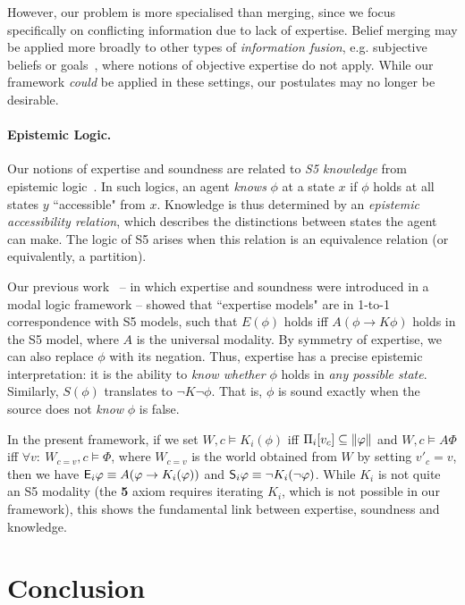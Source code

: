 However, our problem is more specialised than merging, since we focus
specifically on conflicting information due to lack of expertise. Belief
merging may be applied more broadly to other types of \emph{information
fusion}, e.g. subjective beliefs or goals~\cite{gregoire_fusion_2006},
where notions of objective expertise do not apply. While our framework
\emph{could} be applied in these settings, our postulates may no longer be
desirable.

\paragraph{Epistemic Logic.}

Our notions of expertise and soundness are related to \emph{S5
knowledge} from epistemic logic~\cite{handbook_epistemic}. In such
logics, an agent \emph{knows} $\phi$ at a state $x$ if $\phi$ holds at all
states $y$ ``accessible" from $x$. Knowledge is thus determined by an
\emph{epistemic accessibility relation}, which describes the distinctions
between states the agent can make. The logic of S5 arises when this relation is an
equivalence relation (or equivalently, a partition).

Our previous work~\cite{singleton2021logic} -- in which expertise and soundness
were introduced in a modal logic framework -- showed that ``expertise
models" are in 1-to-1 correspondence with S5 models, such that $E(\phi)$
holds iff $A(\phi \rightarrow K\phi)$ holds in the S5 model, where $A$ is the
universal modality. By symmetry of expertise, we can also replace $\phi$ with
its negation. Thus, expertise has a precise epistemic interpretation: it is the
ability to \emph{know whether} $\phi$ holds in \emph{any possible state}.
Similarly, $S(\phi)$ translates to $\neg K \neg \phi$. That is, $\phi$ is sound
exactly when the source does not \emph{know} $\phi$ is false.

In the present framework, if we set
%
$W, c \models K_i(\phi)$ iff $\Pi_i[v_c] \subseteq \propmods{\phi}$ and
%
$W, c \models A\Phi$ iff $\forall v:\ W_{c=v}, c \models \Phi$,
%
where $W_{c=v}$ is the world obtained from $W$ by setting $v'_c = v$, then we
have $\E_i\phi \equiv A(\phi \rightarrow K_i(\phi))$ and $\S_i\phi \equiv
\neg K_i(\neg \phi)$. While $K_i$ is not quite an S5 modality (the \textbf{5}
axiom requires iterating $K_i$, which is not possible in our framework), this
shows the fundamental link between expertise, soundness and knowledge.

\section{Conclusion}
\label{kr_sec_conclusion}

